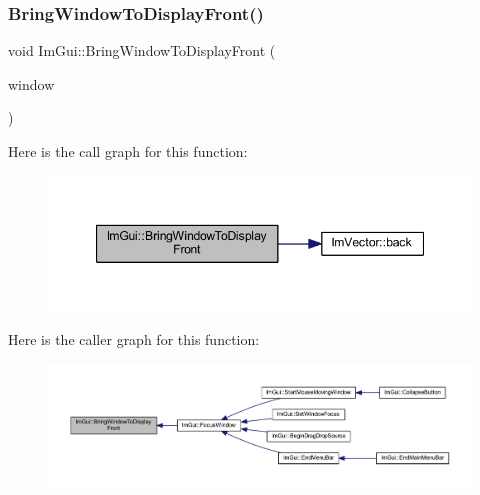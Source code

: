 \mbox{\label{namespace_im_gui_a1f7b95f36d03751c928af7b1b745e959}} 
\subsubsection{\texorpdfstring{Bring\+Window\+To\+Display\+Front()}{BringWindowToDisplayFront()}}
{\footnotesize\ttfamily void Im\+Gui\+::\+Bring\+Window\+To\+Display\+Front (\begin{DoxyParamCaption}\item[{\mbox{\hyperlink{struct_im_gui_window}{Im\+Gui\+Window}} $\ast$}]{window }\end{DoxyParamCaption})}

Here is the call graph for this function\+:
\nopagebreak
\begin{figure}[H]
\begin{center}
\leavevmode
\includegraphics[width=347pt]{namespace_im_gui_a1f7b95f36d03751c928af7b1b745e959_cgraph}
\end{center}
\end{figure}
Here is the caller graph for this function\+:
\nopagebreak
\begin{figure}[H]
\begin{center}
\leavevmode
\includegraphics[width=350pt]{namespace_im_gui_a1f7b95f36d03751c928af7b1b745e959_icgraph}
\end{center}
\end{figure}
\mbox{\label{namespace_im_gui_affe95a2dc969f0d15fbd4b588c94ac1a}} 
